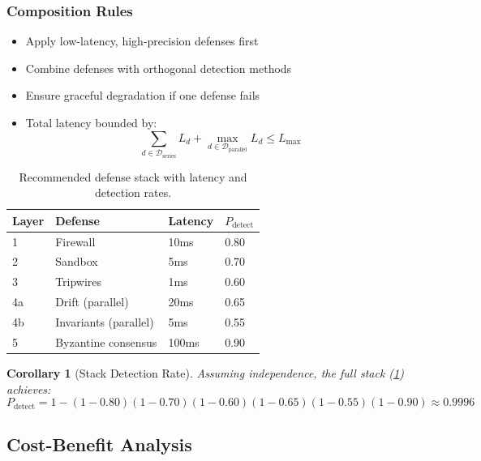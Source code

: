 \documentclass[
]{article}
\newtheorem{corollary}[theorem]{Corollary}
\begin{document}
\subsubsection{Composition Rules}\label{composition-rules}

\begin{itemize}
\item[\textbf{C-Order}:] Apply low-latency, high-precision defenses first
\item[\textbf{C-Diverse}:] Combine defenses with orthogonal detection methods
\item[\textbf{C-Fallback}:] Ensure graceful degradation if one defense fails
\item[\textbf{C-Budget}:] Total latency bounded by:
\begin{equation}
\label{eq:latency-budget}
\sum_{d \in \mathcal{D}_{\text{series}}} L_d + \max_{d \in \mathcal{D}_{\text{parallel}}} L_d \leq L_{\max}
\end{equation}
\end{itemize}

\begin{table}[htbp]
\centering
\caption{Recommended defense stack with latency and detection rates.}
\label{tab:defense-stack}
\begin{tabular}{@{}llll@{}}
\toprule
Layer & Defense & Latency & $P_{\text{detect}}$ \\
\midrule
1 & Firewall & 10ms & 0.80 \\
2 & Sandbox & 5ms & 0.70 \\
3 & Tripwires & 1ms & 0.60 \\
4a & Drift (parallel) & 20ms & 0.65 \\
4b & Invariants (parallel) & 5ms & 0.55 \\
5 & Byzantine consensus & 100ms & 0.90 \\
\bottomrule
\end{tabular}
\end{table}

\begin{corollary}[Stack Detection Rate]
\label{cor:stack-detection}
Assuming independence, the full stack (\cref{tab:defense-stack}) achieves:
\begin{equation}
\label{eq:stack-detection}
P_{\text{detect}} = 1 - (1-0.80)(1-0.70)(1-0.60)(1-0.65)(1-0.55)(1-0.90) \approx 0.9996
\end{equation}
\end{corollary}

\subsection{Cost-Benefit Analysis}\label{sec:cost-benefit}
\end{document}
